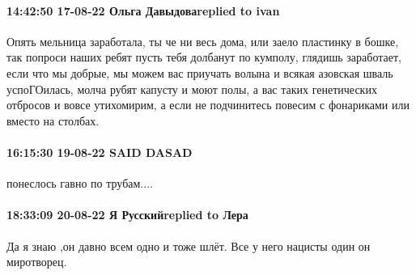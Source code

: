  
 
 
 
 

\paragraph{14:42:50 17-08-22 Ольга Давыдоваreplied to ivan}

Опять мельница заработала, ты че ни весь дома, или заело пластинку в бошке, так
попроси наших ребят пусть тебя долбанут по кумполу, глядишь заработает, если
что мы добрые, мы можем вас приучать волына и всякая азовская шваль
успоГОилась, молча рубят капусту и моют полы, а вас таких генетических отбросов
и вовсе утихомирим, а если не подчинитесь повесим с фонариками или вместо на
столбах.

\paragraph{16:15:30 19-08-22 SAID DASAD}

понеслось гавно по трубам....

\paragraph{18:33:09 20-08-22 Я Русскийreplied to Лера}

Да я знаю ,он давно всем одно и тоже шлёт. Все у него нацисты один он
миротворец.
